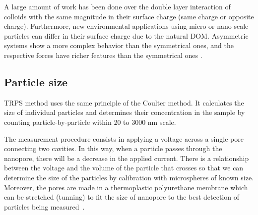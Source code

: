 \documentclass[journal=langd5,manuscript=article]{achemso}
\begin{document}


A large amount of work has been done over the double layer interaction of colloids with the same magnitude in their surface charge (same charge or opposite charge). Furthermore, new environmental  applications using micro or nano-scale particles can differ in their surface charge due to the natural DOM. Asymmetric systems show a more complex behavior than the symmetrical ones, and the respective forces have richer features than the symmetrical ones\cite{Ruiz-Cabello2013} .


\subsection{Particle size}
TRPS method uses the same principle of the Coulter method. It calculates the size of individual particles and determines their  concentration in the sample by counting particle-by-particle within 20 to 3000 nm scale.


The measurement procedure consists in applying a voltage across a single pore connecting two cavities. In this way, when a particle passes through the nanopore, there will be a decrease in the applied current. There is a relationship between the voltage and the volume of the particle that crosses so that we can determine the size of the particles by calibration with microspheres of known size. Moreover, the pores are made in a  thermoplastic polyurethane membrane which can be stretched (tunning) to fit the size of nanopore to the best detection of particles being measured~\cite{Weatherall2016}.

\end{document}
